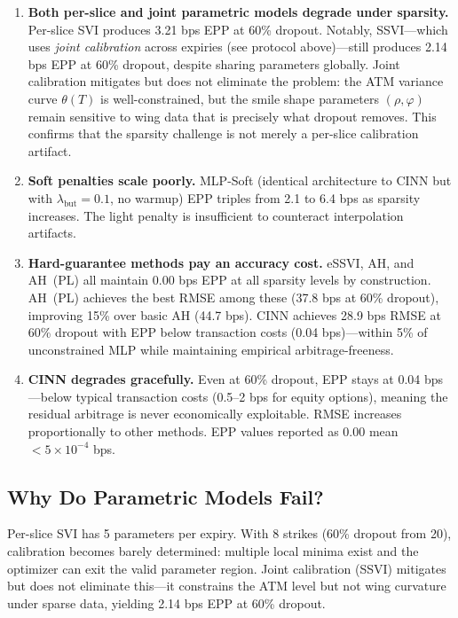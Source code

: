 \documentclass[11pt,a4paper]{article}
\begin{document}
\begin{enumerate}
    \item \textbf{Both per-slice and joint parametric models degrade under sparsity.} Per-slice SVI produces 3.21 bps EPP at 60\% dropout. Notably, SSVI---which uses \textit{joint calibration} across expiries (see protocol above)---still produces 2.14 bps EPP at 60\% dropout, despite sharing parameters globally. Joint calibration mitigates but does not eliminate the problem: the ATM variance curve $\theta(T)$ is well-constrained, but the smile shape parameters $(\rho, \varphi)$ remain sensitive to wing data that is precisely what dropout removes. This confirms that the sparsity challenge is not merely a per-slice calibration artifact.

    \item \textbf{Soft penalties scale poorly.} MLP-Soft (identical architecture to CINN but with $\lambda_{\text{but}} = 0.1$, no warmup) EPP triples from 2.1 to 6.4 bps as sparsity increases. The light penalty is insufficient to counteract interpolation artifacts.

    \item \textbf{Hard-guarantee methods pay an accuracy cost.} eSSVI, AH, and AH~(PL) all maintain 0.00 bps EPP at all sparsity levels by construction. AH~(PL) achieves the best RMSE among these (37.8 bps at 60\% dropout), improving 15\% over basic AH (44.7 bps). CINN achieves 28.9 bps RMSE at 60\% dropout with EPP below transaction costs (0.04 bps)---within 5\% of unconstrained MLP while maintaining empirical arbitrage-freeness.

    \item \textbf{CINN degrades gracefully.} Even at 60\% dropout, EPP stays at 0.04 bps---below typical transaction costs (0.5--2 bps for equity options), meaning the residual arbitrage is never economically exploitable. RMSE increases proportionally to other methods. EPP values reported as $0.00$ mean $< 5 \times 10^{-4}$ bps.
\end{enumerate}

\subsection{Why Do Parametric Models Fail?}

Per-slice SVI has 5 parameters per expiry. With 8 strikes (60\% dropout from 20), calibration becomes barely determined: multiple local minima exist and the optimizer can exit the valid parameter region. Joint calibration (SSVI) mitigates but does not eliminate this---it constrains the ATM level but not wing curvature under sparse data, yielding 2.14 bps EPP at 60\% dropout.
\end{document}
